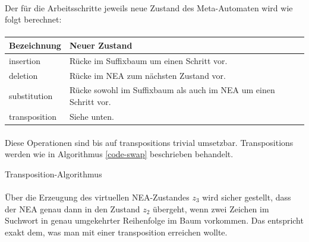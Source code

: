 \paragraph{} Der für die Arbeitsschritte jeweils neue Zustand des Meta-Automaten wird wie folgt berechnet:

\paragraph{}

\begin{tabularx}{\textwidth}{lX}
\hline
\textbf{Bezeichnung} & \textbf{Neuer Zustand} \\ [0.1cm]
\hline
insertion & Rücke im Suffixbaum um einen Schritt vor. \\ [0.1cm]
\hline
deletion & Rücke im NEA zum nächsten Zustand vor. \\ [0.1cm]
\hline
substitution & Rücke sowohl im Suffixbaum als auch im NEA um einen Schritt vor. \\ [0.1cm]
\hline
transposition & Siehe unten. \\ [0.1cm]
\hline
\end{tabularx}

\paragraph{} Diese Operationen sind bis auf transpositions trivial umsetzbar. Transpositions werden wie in Algorithmus \ref{code-swap} beschrieben behandelt.

\begin{algorithm}
\caption{Transposition-Algorithmus}
\label{code-swap}
\begin{algorithmic}
\ENDFOR
\ENDIF
\ENDFOR
\end{algorithmic}
\end{algorithm}

\paragraph{} Über die Erzeugung des virtuellen NEA-Zustandes $z_3$ wird sicher gestellt, dass der NEA genau dann in den Zustand $z_2$ übergeht, wenn zwei Zeichen im Suchwort in genau umgekehrter Reihenfolge im Baum vorkommen. Das entspricht exakt dem, was man mit einer transposition erreichen wollte.
